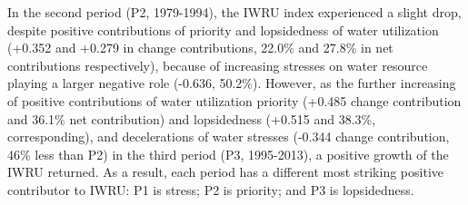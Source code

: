 \documentclass[9pt, twocolumn, twoside, lineno]{pnas-new}
\begin{document}
In the second period (P2, 1979-1994), the IWRU index experienced a slight drop, despite positive contributions of priority and lopsidedness of water utilization (+0.352 and +0.279 in change contributions, 22.0\% and 27.8\% in net contributions respectively), because of increasing stresses on water resource playing a larger negative role (-0.636, 50.2\%). 
However, as the further increasing of positive contributions of water utilization priority (+0.485 change contribution and 36.1\% net contribution) and lopsidedness (+0.515 and 38.3\%, corresponding), and decelerations of water stresses (-0.344 change contribution, 46\% less than P2) in the third period (P3, 1995-2013), a positive growth of the IWRU returned.
As a result, each period has a different most striking positive contributor to IWRU: P1 is stress; P2 is priority; and P3 is lopsidedness.
\end{document}
